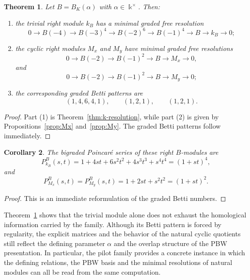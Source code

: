 \documentclass[reqno]{amsart}
\numberwithin{equation}{section}
\newtheorem{theorem}{Theorem}[section]
\newtheorem{corollary}[theorem]{Corollary}
\theoremstyle{definition}
\begin{document}
\begin{theorem}\label{thm:comparison}
Let \(B=B_K(\alpha)\) with \(\alpha\in\Bbbk^\times\). Then:
\begin{enumerate}[label=\rm (\arabic*)]
    \item the trivial right module \(k_B\) has a minimal graded free resolution
    \[
    0\longrightarrow B(-4)\longrightarrow B(-3)^4\longrightarrow B(-2)^6\longrightarrow B(-1)^4\longrightarrow B\longrightarrow k_B\longrightarrow 0;
    \]
    \item the cyclic right modules \(M_x\) and \(M_y\) have minimal graded free resolutions
    \[
    0\longrightarrow B(-2)\longrightarrow B(-1)^2\longrightarrow B\longrightarrow M_x\longrightarrow 0,
    \]
    and
    \[
    0\longrightarrow B(-2)\longrightarrow B(-1)^2\longrightarrow B\longrightarrow M_y\longrightarrow 0;
    \]
    \item the corresponding graded Betti patterns are
    \[
    (1,4,6,4,1),\qquad (1,2,1),\qquad (1,2,1).
    \]
\end{enumerate}
\end{theorem}

\begin{proof}
Part \rm(1) is Theorem~\ref{thm:k-resolution}, while part \rm(2) is given by Propositions~\ref{prop:Mx} and~\ref{prop:My}. The graded Betti patterns follow immediately.
\end{proof}

\begin{corollary}\label{cor:poincare}
The bigraded Poincar\'e series of these right \(B\)-modules are
\[
P_{k_B}^B(s,t)=1+4st+6s^2t^2+4s^3t^3+s^4t^4=(1+st)^4,
\]
and
\[
P_{M_x}^B(s,t)=P_{M_y}^B(s,t)=1+2st+s^2t^2=(1+st)^2.
\]
\end{corollary}

\begin{proof}
This is an immediate reformulation of the graded Betti numbers.
\end{proof}

Theorem~\ref{thm:comparison} shows that the trivial module alone does not exhaust the homological information carried by the family. Although its Betti pattern is forced by regularity, the explicit matrices and the behavior of the natural cyclic quotients still reflect the defining parameter \(\alpha\) and the overlap structure of the PBW presentation. In particular, the pilot family provides a concrete instance in which the defining relations, the PBW basis and the minimal resolutions of natural modules can all be read from the same computation.
\end{document}
